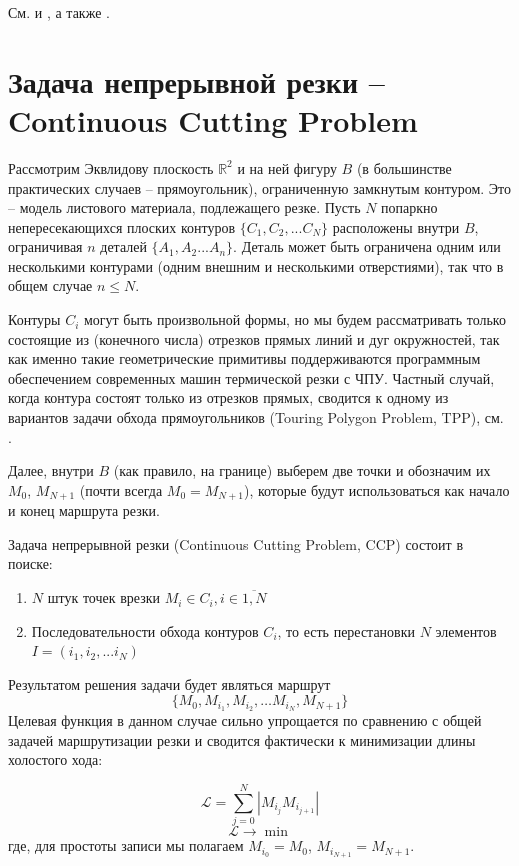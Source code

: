 \documentclass[14pt]{extarticle}
\theoremstyle{plain}%
\theoremstyle{definition}
\theoremstyle{remark}
\begin{document}
См.
\cite{berlin2019}
и
\cite{bi07},
а также
\cite{Miskolc,Sozopol,Obuhovo}.

\section{Задача непрерывной резки -- Continuous Cutting Problem}

Рассмотрим Эквлидову плоскость
$\mathbb R ^ 2$
и на ней фигуру
$B$
(в большинстве практических случаев -- прямоугольник),
ограниченную замкнутым контуром.
Это -- модель листового материала,
подлежащего резке.
Пусть
$N$
попаркно непересекающихся плоских контуров
$\{C_1, C_2, ... C_N\}$
расположены внутри
$B$,
ограничивая
$n$
деталей
$\{A_1, A_2 ... A_n\}$.
Деталь может быть ограничена
одним или несколькими контурами
(одним внешним и несколькими отверстиями),
так что в общем случае
$n \leqslant N$.

Контуры
$C_i$
могут быть произвольной формы,
но мы будем рассматривать только
состоящие из
(конечного числа)
отрезков прямых линий и дуг окружностей,
так как именно такие геометрические примитивы
поддерживаются программным обеспечением
современных машин термической резки с ЧПУ.
Частный случай,
когда контура состоят только
из отрезков прямых,
сводится к одному из вариантов
задачи обхода прямоугольников
(Touring Polygon Problem, TPP),
см.
\cite{bi13}.

Далее,
внутри
$B$
(как правило, на границе)
выберем две точки и обозначим их
$M_0$, $M_{N + 1}$
(почти всегда $M_0 = M_{N + 1}$),
которые будут использоваться
как начало и конец
маршрута резки.

Задача непрерывной резки
(Continuous Cutting Problem, CCP)
состоит в поиске:
\begin{enumerate}
\item
$N$ штук точек врезки $M_i \in C_i, i \in \overline{1, N}$
\item
Последовательности обхода контуров
$C_i$,
то есть перестановки
$N$
элементов
$I = (i_1, i_2, ... i_N)$
\end{enumerate}

Результатом решения задачи будет являться маршрут
\begin{equation}
  \{M_0, M_{i_1}, M_{i_2}, \dots M_{i_N}, M_{N + 1}\}
\end{equation}
Целевая функция в данном случае сильно упрощается
по сравнению с общей задачей маршрутизации резки
и сводится фактически к минимизации длины холостого хода:

\begin{equation}
  \mathcal{L} = \sum_{j=0}^N|M_{i_j}M_{i_{j+1}}|
  \label{air-move-length}
\end{equation}
$$
\mathcal{L} \to \min
$$
где, для простоты записи мы полагаем
$M_{i_0} = M_0$,
$M_{i_{N + 1}} = M_{N + 1}$.
\end{document}
